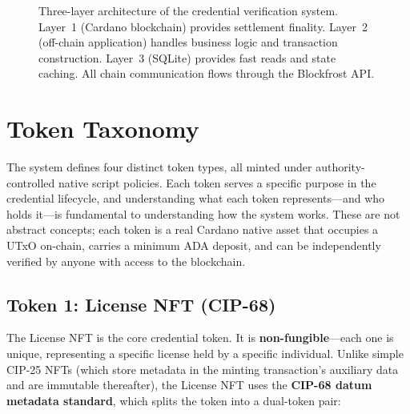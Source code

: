 \begin{figure}[htbp]
\caption{Three-layer architecture of the credential verification system. Layer~1 (Cardano blockchain) provides settlement finality. Layer~2 (off-chain application) handles business logic and transaction construction. Layer~3 (SQLite) provides fast reads and state caching. All chain communication flows through the Blockfrost API.}
\label{fig:ch5-architecture}
\end{figure}


\section{Token Taxonomy}
\label{sec:ch5-tokens}

The system defines four distinct token types, all minted under authority-controlled native script policies. Each token serves a specific purpose in the credential lifecycle, and understanding what each token represents---and who holds it---is fundamental to understanding how the system works. These are not abstract concepts; each token is a real Cardano native asset that occupies a UTxO on-chain, carries a minimum ADA deposit, and can be independently verified by anyone with access to the blockchain.

\subsection{Token 1: License NFT (CIP-68)}

The License NFT is the core credential token. It is \textbf{non-fungible}---each one is unique, representing a specific license held by a specific individual. Unlike simple CIP-25 NFTs (which store metadata in the minting transaction's auxiliary data and are immutable thereafter), the License NFT uses the \textbf{CIP-68 datum metadata standard}, which splits the token into a dual-token pair:

